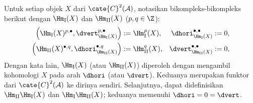Untuk setiap objek $X$ dari $\cate{C}^2(\mathcal{A})$, notasikan
bikompleks-bikompleks berikut dengan $\Hm_{\mathrm{I}}(X)$ dan
$\Hm_{\mathrm{II}}(X)$ ($p,q \in \Z$):
\begin{equation}\label{eqn:HIHII}\begin{aligned}
	\left( \Hm_{\mathrm{I}}(X)^{p, \bullet}, \dvert_{\Hm_{\mathrm{I}}(X)}^{p, \bullet} \right) & := \Hm_{\mathrm{I}}^p(X), &
	\dhori_{\Hm_{\mathrm{I}}(X)}^{\bullet, \bullet} := 0, \\
	\left( \Hm_{\mathrm{II}}(X)^{\bullet, q}, \dhori_{\Hm_{\mathrm{II}}(X)}^{\bullet, q} \right) & := \Hm_{\mathrm{II}}^q(X), &
	\dvert_{\Hm_{\mathrm{II}}(X)}^{\bullet, \bullet} := 0,
\end{aligned}\end{equation}
Dengan kata lain, $\Hm_{\mathrm{I}}(X)$ (atau $\Hm_{\mathrm{II}}(X)$)
diperoleh dengan mengambil kohomologi $X$ pada arah $\dhori$ (atau
$\dvert$). Keduanya merupakan funktor dari $\cate{C}^2(\mathcal{A})$ ke
dirinya sendiri. Selanjutnya, dapat didefinisikan
$\Hm_{\mathrm{II}} \Hm_{\mathrm{I}}(X)$ dan
$\Hm_{\mathrm{I}} \Hm_{\mathrm{II}} (X)$; keduanya memenuhi
$\dhori = 0 = \dvert$.


